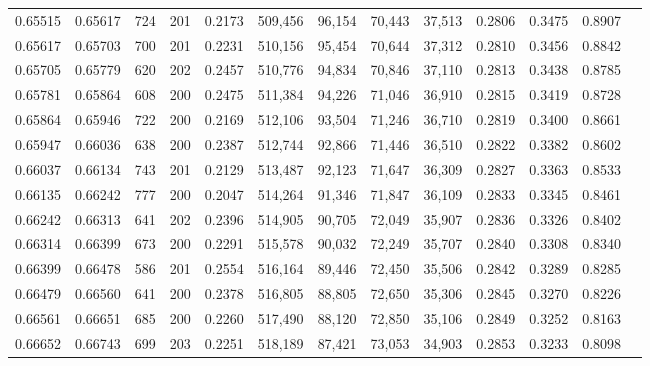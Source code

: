 \begin{tabular}{rrrrrrrrrrrrr}
0.65515 & 0.65617 &   724 & 201 &                                     0.2173 & 509,456 &  96,154 &  70,443 &  37,513 & 0.2806 & 0.3475 & 0.8907 \\
0.65617 & 0.65703 &   700 & 201 &                                     0.2231 & 510,156 &  95,454 &  70,644 &  37,312 & 0.2810 & 0.3456 & 0.8842 \\
0.65705 & 0.65779 &   620 & 202 &                                     0.2457 & 510,776 &  94,834 &  70,846 &  37,110 & 0.2813 & 0.3438 & 0.8785 \\
0.65781 & 0.65864 &   608 & 200 &                                     0.2475 & 511,384 &  94,226 &  71,046 &  36,910 & 0.2815 & 0.3419 & 0.8728 \\
0.65864 & 0.65946 &   722 & 200 &                                     0.2169 & 512,106 &  93,504 &  71,246 &  36,710 & 0.2819 & 0.3400 & 0.8661 \\
0.65947 & 0.66036 &   638 & 200 &                                     0.2387 & 512,744 &  92,866 &  71,446 &  36,510 & 0.2822 & 0.3382 & 0.8602 \\
0.66037 & 0.66134 &   743 & 201 &                                     0.2129 & 513,487 &  92,123 &  71,647 &  36,309 & 0.2827 & 0.3363 & 0.8533 \\
0.66135 & 0.66242 &   777 & 200 &                                     0.2047 & 514,264 &  91,346 &  71,847 &  36,109 & 0.2833 & 0.3345 & 0.8461 \\
0.66242 & 0.66313 &   641 & 202 &                                     0.2396 & 514,905 &  90,705 &  72,049 &  35,907 & 0.2836 & 0.3326 & 0.8402 \\
0.66314 & 0.66399 &   673 & 200 &                                     0.2291 & 515,578 &  90,032 &  72,249 &  35,707 & 0.2840 & 0.3308 & 0.8340 \\
0.66399 & 0.66478 &   586 & 201 &                                     0.2554 & 516,164 &  89,446 &  72,450 &  35,506 & 0.2842 & 0.3289 & 0.8285 \\
0.66479 & 0.66560 &   641 & 200 &                                     0.2378 & 516,805 &  88,805 &  72,650 &  35,306 & 0.2845 & 0.3270 & 0.8226 \\
0.66561 & 0.66651 &   685 & 200 &                                     0.2260 & 517,490 &  88,120 &  72,850 &  35,106 & 0.2849 & 0.3252 & 0.8163 \\
0.66652 & 0.66743 &   699 & 203 &                                     0.2251 & 518,189 &  87,421 &  73,053 &  34,903 & 0.2853 & 0.3233 & 0.8098 \\

\end{tabular}
